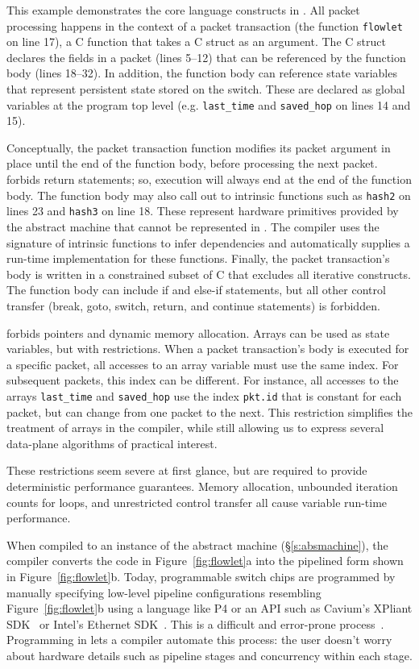 This example demonstrates the core language constructs in \pktlanguage. All
packet processing happens in the context of a packet transaction (the function
\texttt{flowlet} on line 17), a C function that takes a C struct as an
argument. The C struct declares the fields in a packet (lines 5--12) that can
be referenced by the function body (lines 18--32).  In addition, the function
body can reference state variables that represent persistent state stored on
the switch. These are declared as global variables at the program top level
(e.g. \texttt{last\_time} and \texttt{saved\_hop} on lines 14 and 15).

Conceptually, the packet transaction function modifies its packet argument in
place until the end of the function body, before processing the next packet.
\pktlanguage forbids return statements; so, execution will always end at the
end of the function body. The function body may also call out to intrinsic
functions such as \texttt{hash2} on lines 23 and \texttt{hash3} on line 18.
These represent hardware primitives provided by the abstract machine that
cannot be represented in \pktlanguage. The \pktlanguage compiler uses the
signature of intrinsic functions to infer dependencies and automatically
supplies a run-time implementation for these functions. Finally, the packet
transaction's body is written in a constrained subset of C that excludes all
iterative constructs. The function body can include if and else-if statements,
but all other control transfer (break, goto, switch, return, and continue
statements) is forbidden.

\pktlanguage forbids pointers and dynamic memory allocation. Arrays can be used
as state variables, but with restrictions. When a packet transaction's body is
executed for a specific packet, all accesses to an array variable must use the
same index. For subsequent packets, this index can be different. For instance,
all accesses to the arrays \texttt{last\_time} and \texttt{saved\_hop} use the
index \texttt{pkt.id} that is constant for each packet, but can change from one
packet to the next. This restriction simplifies the treatment of arrays in the
compiler, while still allowing us to express several data-plane algorithms of
practical interest.

These restrictions seem severe at first glance, but are required to provide
deterministic performance guarantees. Memory allocation, unbounded iteration
counts for loops, and unrestricted control transfer all cause variable run-time
performance.

When compiled to an instance of the \absmachine abstract machine (\S\ref{s:absmachine}), the
\pktlanguage compiler converts the code in Figure~\ref{fig:flowlet}a into the
pipelined form shown in Figure~\ref{fig:flowlet}b. Today, programmable switch
chips are programmed by manually specifying low-level pipeline configurations
resembling Figure~\ref{fig:flowlet}b using a language like P4 or an API such as
Cavium's XPliant SDK~\cite{xpliant_sdk} or Intel's Ethernet
SDK~\cite{intel_sdk}. This is a difficult and error-prone
process~\cite{p4-semantics}.  Programming in \pktlanguage lets a compiler
automate this process: the user doesn't worry about hardware details such as
pipeline stages and concurrency within each stage.
